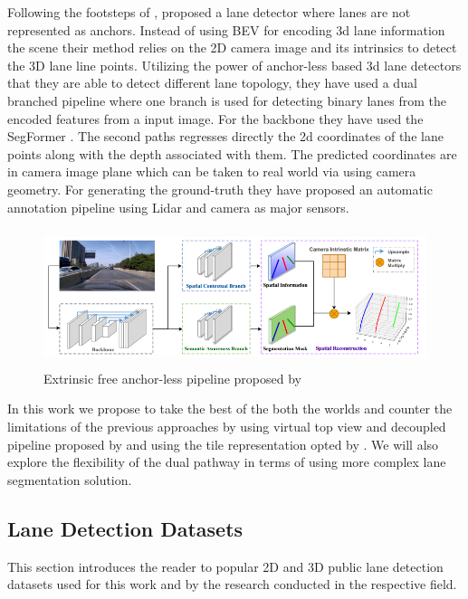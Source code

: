 Following the footsteps of \cite{DBLP:journals/corr/abs-2011-01535}, \cite{yan2022once} proposed a lane detector where lanes are not represented as anchors. Instead of using BEV for encoding 3d lane information the scene their method relies on the 2D camera image and its intrinsics to detect the 3D lane line points. Utilizing the power of anchor-less based 3d lane detectors that they are able to detect different lane topology, they have used a dual branched pipeline where one branch is used for detecting binary lanes from the encoded features from a input image. For the backbone they have used the SegFormer \cite{DBLP:journals/corr/abs-2105-15203}. The second paths regresses directly the 2d coordinates of the lane points along with the depth associated with them. The predicted coordinates are in camera image plane which can be taken to real world via using camera geometry. For generating the ground-truth they have proposed an automatic annotation pipeline using Lidar and camera as major sensors.

\begin{figure}[h]
    \centering
\includegraphics[width=12cm, height=4cm]{images/once_pipeline.png}
    \caption{Extrinsic free anchor-less pipeline proposed by \cite{yan2022once}}
    \end{figure}

In this work we propose to take the best of the both the worlds and counter the limitations of the previous approaches by using virtual top view and decoupled pipeline proposed by \cite{guo2020gen} and using the tile representation opted by \cite{DBLP:journals/corr/abs-2011-01535}. We will also explore the flexibility of the dual pathway in terms of using more complex lane segmentation solution.

\subsection{Lane Detection Datasets}
This section introduces the reader to popular 2D and 3D public lane detection datasets used for this work and by the research conducted in the respective field. 

